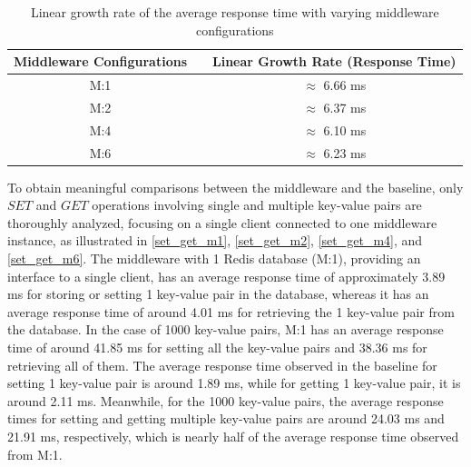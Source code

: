 \begin{table} [H]
\centering
\begin{tabular}{@{} ccc @{}} %
	\toprule
	 Middleware Configurations & & Linear Growth Rate (Response Time) \\
	\midrule
	M:1 &	&	 $\approx$ 6.66 ms \\
	M:2 &	&	 $\approx$ 6.37 ms \\
	M:4 &	&	 $\approx$ 6.10 ms \\
	M:6 &	&	 $\approx$ 6.23 ms \\
	\bottomrule
\end{tabular}
\caption{Linear growth rate of the average response time with varying middleware configurations}
\label{tab:linear_growth_rate}
\end{table}

\noindent To obtain meaningful comparisons between the middleware and the baseline, only $SET$ and $GET$ operations involving single and multiple key-value pairs are thoroughly analyzed, focusing on a single client connected to one middleware instance, as illustrated in \cref{set_get_m1}, \cref{set_get_m2}, \cref{set_get_m4}, and \cref{set_get_m6}. The middleware with 1 Redis database (M:1), providing an interface to a single client, has an average response time of approximately 3.89 ms for storing or setting 1 key-value pair in the database, whereas it has an average response time of around 4.01 ms for retrieving the 1 key-value pair from the database. In the case of 1000 key-value pairs, M:1 has an average response time of around 41.85 ms for setting all the key-value pairs and 38.36 ms for retrieving all of them. The average response time observed in the baseline for setting 1 key-value pair is around 1.89 ms, while for getting 1 key-value pair, it is around 2.11 ms. Meanwhile, for the 1000 key-value pairs, the average response times for setting and getting multiple key-value pairs are around 24.03 ms and 21.91 ms, respectively, which is nearly half of the average response time observed from M:1.

